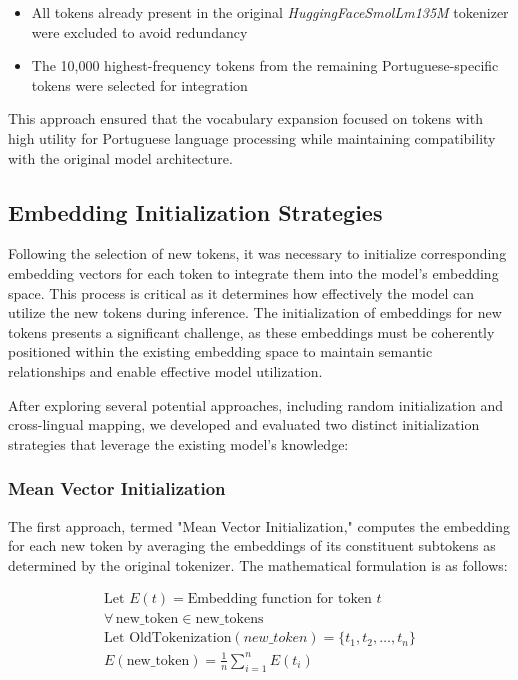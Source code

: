 \begin{itemize}
    \item All tokens already present in the original \textit{HuggingFaceSmolLm135M} tokenizer were excluded to avoid redundancy
    \item The 10,000 highest-frequency tokens from the remaining Portuguese-specific tokens were selected for integration
\end{itemize}

This approach ensured that the vocabulary expansion focused on tokens with high utility for Portuguese language processing while maintaining compatibility with the original model architecture.

\subsection{Embedding Initialization Strategies}
Following the selection of new tokens, it was necessary to initialize corresponding embedding vectors for each token to integrate them into the model's embedding space. This process is critical as it determines how effectively the model can utilize the new tokens during inference. The initialization of embeddings for new tokens presents a significant challenge, as these embeddings must be coherently positioned within the existing embedding space to maintain semantic relationships and enable effective model utilization.

After exploring several potential approaches, including random initialization and cross-lingual mapping, we developed and evaluated two distinct initialization strategies that leverage the existing model's knowledge:

\subsubsection{Mean Vector Initialization}
The first approach, termed "Mean Vector Initialization," computes the embedding for each new token by averaging the embeddings of its constituent subtokens as determined by the original tokenizer. The mathematical formulation is as follows:

$$
\begin{array}{c}
    \text{Let } E(t) = \text{Embedding function for token } t \\
    \forall\, \text{new\_token} \in \text{new\_tokens} \\
    \text{Let } \text{OldTokenization}(new\_token) = \{t_1, t_2, \ldots, t_n\} \\
    E(\text{new\_token}) = \frac{1}{n} \sum_{i=1}^{n} E(t_i)
\end{array}
$$


